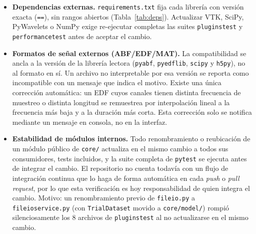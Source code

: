 \documentclass[11pt,a4paper]{article}
\DeclareRobustCommand{\_}{\textunderscore\allowbreak}
\begin{document}
\begin{itemize}
    \item \textbf{Dependencias externas.} \texttt{requirements.txt} fija cada librer\'ia con versi\'on exacta (\texttt{==}), sin rangos abiertos (Tabla~\ref{tab:deps}). Actualizar VTK, SciPy, PyWavelets o NumPy exige re-ejecutar completas las suites \texttt{plugins\_\allowbreak test} y \texttt{performance\_\allowbreak test} antes de aceptar el cambio.

    \item \textbf{Formatos de se\~nal externos (ABF/EDF/MAT).} La compatibilidad se ancla a la versi\'on de la librer\'ia lectora (\texttt{pyabf}, \texttt{pyedflib}, \texttt{scipy} y \texttt{h5py}), no al formato en s\'i. Un archivo no interpretable por esa versi\'on se reporta como incompatible con un mensaje que indica el motivo. Existe una \'unica correcci\'on autom\'atica: un EDF cuyos canales tienen distinta frecuencia de muestreo o distinta longitud se remuestrea por interpolaci\'on lineal a la frecuencia m\'as baja y a la duraci\'on m\'as corta. Esta correcci\'on solo se notifica mediante un mensaje en consola, no en la interfaz.

    \item \textbf{Estabilidad de m\'odulos internos.} Todo renombramiento o reubicaci\'on de un m\'odulo p\'ublico de \texttt{core/} actualiza en el mismo cambio a todos sus consumidores, tests incluidos, y la suite completa de \texttt{pytest} se ejecuta antes de integrar el cambio. El repositorio no cuenta todav\'ia con un flujo de integraci\'on continua que lo haga de forma autom\'atica en cada \textit{push} o \textit{pull request}, por lo que esta verificaci\'on es hoy responsabilidad de quien integra el cambio. Motivo: un renombramiento previo de \texttt{fileio.py} a \texttt{fileio\_\allowbreak service.py} (con \texttt{TrialDataset} movido a \texttt{core/\allowbreak model/}) rompi\'o silenciosamente los 8 archivos de \texttt{plugins\_\allowbreak test} al no actualizarse en el mismo cambio.
\end{itemize}
\end{document}
